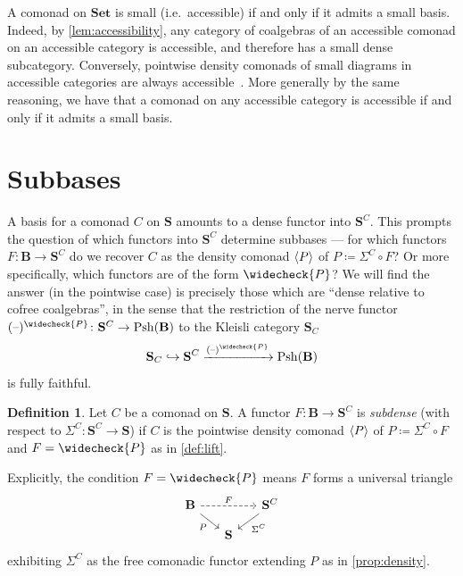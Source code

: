 \documentclass[11pt, oneside, article]{memoir}
\theoremstyle{plain}
\theoremstyle{definition}
\newtheorem{definition}[def]{Definition}
\theoremstyle{remark}
\newenvironment{remark}
{\renewcommand\qedsymbol{$\lrcorner$}%
  \pushQED{\qed}\myremark}
{\popQED\endmyremark}
\DeclareMathOperator{\Psh}{Psh}
\DeclarePairedDelimiter{\gen}{\langle}{\rangle}
\newcommand{\dash}{{\mathord{\text{--}}}}
\newcommand{\xto}[1]{\xrightarrow{#1}}
\newcommand{\namedcat}[1]{\mathbf{#1}}
\newcommand{\cat}[1]{\mathbf{#1}}
\newcommand{\Set}{\namedcat{Set}}
\newcommand{\CoalgOn}[2]{{#2}^{#1}}
\newcommand{\CoalgS}[1]{\CoalgOn{#1}{\bS}}
\newcommand{\KlOn}[2]{{#2}_{#1}}
\newcommand{\KlS}[1]{\KlOn{#1}{\bS}}
\newcommand{\lift}[1]{\widecheck{#1}}
\newcommand{\nerve}[1]{(\dash)^{#1}}
\newcommand{\carr}{\Sigma}
\newcommand{\car}[1]{\carr^{#1}}
\newcommand{\carC}{\car{\cC}}
\newcommand{\ph}[1]{#1}
\newcommand{\Ps}[1]{\Psh(#1)}
\newcommand{\cmnd}[1]{{#1}}
\newcommand{\cC}{\cmnd{C}}
\newcommand{\bB}{\cat{B}}
\newcommand{\bS}{\cat{S}}
\newcommand{\pP}{\ph{P}}
\newcommand{\cP}{\gen{\pP}}
\newcommand{\lP}{\lift{\pP}}
\newcommand{\CS}{\CoalgS{\cC}}
\newcommand{\PS}{\CoalgS{\cP}}
\newcommand{\KlCS}{\KlS{\cC}}
\begin{document}
\begin{remark}
  A comonad on $\Set$ is small (i.e.\ accessible) if and only if it
  admits a small basis. Indeed, by \cref{lem:accessibility}, any
  category of coalgebras of an accessible comonad on an accessible
  category is accessible, and therefore has a small dense
  subcategory. Conversely, pointwise density comonads of small
  diagrams in accessible categories are always
  accessible~\cite[Proposition 2.4.3]{makkai-pare}. More generally by
  the same reasoning, we have that a comonad on any accessible
  category is accessible if and only if it admits a small basis.
\end{remark}

\section{Subbases}\label{sec:subbases}

A basis for a comonad $\cC$ on $\bS$ amounts to a dense functor into
$\CS$. This prompts the question of which functors into $\CS$
determine subbases --- for which functors $F \colon \bB \to \CS$ do we
recover $\cC$ as the density comonad $\cP$ of
$\pP \coloneqq \carC \circ F$?  Or more specifically, which functors
are of the form $\lP$? We will find the answer (in the pointwise case)
is precisely those which are ``dense relative to cofree coalgebras'',
in the sense that the restriction of the nerve functor
$\nerve{\lP} \colon \CS \to \Ps{\bB}$ to the Kleisli category $\KlCS$
\[\KlCS \hookrightarrow \CS
  \xto{\nerve{\lP}} \Ps{\bB}\] is fully faithful.

\begin{definition}\label{def:subbasis}
  Let $\cC$ be a comonad on $\bS$. A functor $F \colon \bB \to \CS$ is
  \emph{subdense} (with respect to $\carC \colon \CS \to \bS$) if
  $\cC$ is the pointwise density comonad $\cP$ of
  $\pP \coloneqq \carC \circ F$ and $F = \lP$ as in \cref{def:lift}.
  
  Explicitly, the condition $F = \lP$ means $F$ forms a universal
  triangle
  \[
    \begin{tikzcd}[row sep=10pt,column sep=15pt]
      {\bB} && {\CS} %
      \\
        & {\bS}
        \arrow["F", dashed, from=1-1, to=1-3]
        \arrow["\pP"', from=1-1, to=2-2]
        \arrow["\carC", from=1-3, to=2-2]
      \end{tikzcd}
    \]
    exhibiting $\carC$ as the free comonadic functor extending $\pP$
    as in \cref{prop:density}.
\end{definition}
\end{document}
